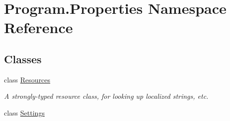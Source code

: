 \hypertarget{namespace_program_1_1_properties}{}\section{Program.\+Properties Namespace Reference}
\label{namespace_program_1_1_properties}
\subsection*{Classes}
\begin{DoxyCompactItemize}
\item 
class \hyperlink{class_program_1_1_properties_1_1_resources}{Resources}
\begin{DoxyCompactList}\small\item\em A strongly-\/typed resource class, for looking up localized strings, etc. \end{DoxyCompactList}\item 
class \hyperlink{class_program_1_1_properties_1_1_settings}{Settings}
\end{DoxyCompactItemize}
